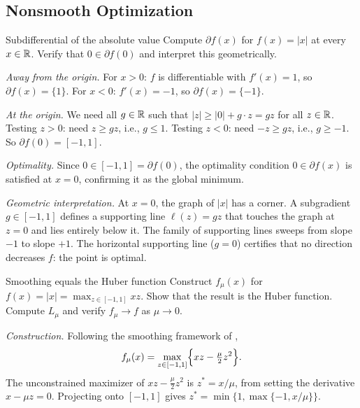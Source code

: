 \subsection{Nonsmooth Optimization}\label{app:ex-nonsmooth}

\begin{exercise}{Subdifferential of the absolute value}\label{ex:subdiff-abs}
	Compute $\partial f(x)$ for $f(x) = |x|$ at every $x \in \mathbb{R}$.
	Verify that $0 \in \partial f(0)$ and interpret this geometrically.
\end{exercise}

\solution
\textit{Away from the origin.}
For $x > 0$: $f$ is differentiable with $f'(x) = 1$, so $\partial f(x) = \{1\}$.
For $x < 0$: $f'(x) = -1$, so $\partial f(x) = \{-1\}$.

\textit{At the origin.}
We need all $g \in \mathbb{R}$ such that $|z| \geq |0| + g \cdot z = gz$ for all $z \in \mathbb{R}$.
Testing $z > 0$: need $z \geq gz$, i.e., $g \leq 1$.
Testing $z < 0$: need $-z \geq gz$, i.e., $g \geq -1$.
So $\partial f(0) = [-1, 1]$.

\textit{Optimality.}
Since $0 \in [-1, 1] = \partial f(0)$, the optimality condition $0 \in \partial f(x)$ is satisfied at $x = 0$, confirming it as the global minimum.

\textit{Geometric interpretation.}
At $x = 0$, the graph of $|x|$ has a corner.
A subgradient $g \in [-1, 1]$ defines a supporting line $\ell(z) = gz$ that touches the graph at $z = 0$ and lies entirely below it.
The family of supporting lines sweeps from slope $-1$ to slope $+1$.
The horizontal supporting line ($g = 0$) certifies that no direction decreases $f$: the point is optimal.

\begin{exercise}{Smoothing equals the Huber function}\label{ex:smoothing-abs}
	Construct $f_\mu(x)$ for $f(x) = |x| = \max_{z \in [-1,1]} xz$.
	Show that the result is the Huber function.
	Compute $L_\mu$ and verify $f_\mu \to f$ as $\mu \to 0$.
\end{exercise}

\solution
\textit{Construction.}
Following the smoothing framework of ,
\[
	f_\mu(x) = \max_{z \in [-1,1]}\Bigl\{xz - \tfrac{\mu}{2}z^2\Bigr\}.
\]
The unconstrained maximizer of $xz - \frac{\mu}{2}z^2$ is $z^* = x/\mu$, from setting the derivative $x - \mu z = 0$.
Projecting onto $[-1, 1]$ gives $z^* = \min\{1, \max\{-1, x/\mu\}\}$.

